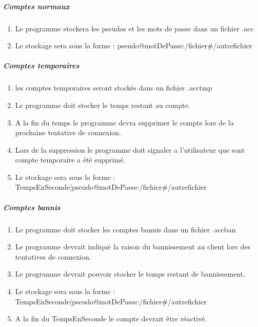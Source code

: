 \documentclass[10pt,a4paper]{report}
\begin{document}
	\subparagraph{Comptes normaux}
		\begin{enumerate}
			\item Le programme stockera les pseudos et les mots de passe dans un fichier .acc
			\item Le stockage sera sous la forme : pseudo@motDePasse:/fichier\#/autrefichier
		\end{enumerate}
	\subparagraph{Comptes temporaires}
		\begin{enumerate}
			\item les comptes temporaires seront stockés dans un fichier .acctmp
			\item Le programme doit stocker le temps restant au compte.
			\item A la fin du temps le programme devra supprimer le compte lors de la prochaine tentative de connexion.
			\item Lors de la suppression le programme doit signaler a l'utilisateur que sont compte temporaire a été supprimé.
			\item Le stockage sera sous la forme : TempsEnSeconde|pseudo@motDePasse:/fichier\#/autrefichier
		\end{enumerate}
	\subparagraph{Comptes bannis}
		\begin{enumerate}
			\item Le programme doit stocker les comptes bannis dans un fichier .accban
			\item Le programme devrait indiqué la raison du bannissement au client lors des tentatives de connexion.
			\item Le programme devrait pouvoir stocker le temps restant de bannissement.
			\item Le stockage sera sous la forme : TempsEnSeconde|pseudo@motDePasse:/fichier\#/autrefichier
			\item A la fin du TempsEnSeconde le compte devrait être réactivé.
		\end{enumerate}
		

	
\end{document}
